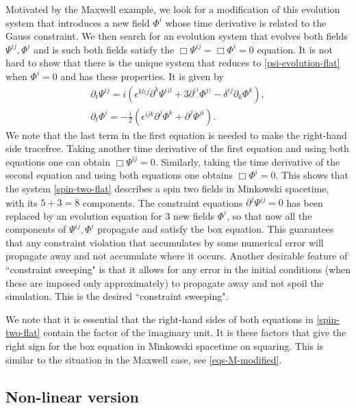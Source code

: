 \documentclass[10pt]{report}
\theoremstyle{definition}
\newcommand{\im}{i}
\begin{document}
Motivated by the Maxwell example, we look for a modification of this evolution system that introduces a new field $\Phi^i$ whose time derivative is related to the Gauss constraint. We then search for an evolution system that evolves both fields $\Psi^{ij}, \Phi^i$ and is such both fields satisfy the $\Box\Psi^{ij}=\Box \Phi^i=0$ equation. It is not hard to show that there is the unique system that reduces to \cref{psi-evolution-flat} when $\Phi^i=0$ and has these properties. It is given by
\begin{align}\label{spin-two-flat}
\partial_t \Psi^{ij} = \im \left(\epsilon^{kl(j} \partial^k \Psi^{i)l} + 3 \partial^{(i} \Phi^{j)} - \delta^{ij} \partial_k \Phi^k\right), \\ \nonumber
\partial_t \Phi^i = - \frac{\im}{2} \left( \epsilon^{ijk} \partial^j \Phi^k + \partial^{j} \Psi^{ji}\right).
\end{align}
We note that the last term in the first equation is needed to make the right-hand side tracefree. Taking another time derivative of the first equation and using both equations one can obtain $\Box\Psi^{ij}=0$. Similarly, taking the time derivative of the second equation and using both equations one obtains $\Box\Phi^i=0$. This shows that the system \cref{spin-two-flat} describes a spin two fields in Minkowski spacetime, with its $5+3=8$ components. The constraint equations $\partial^j\Psi^{ij}=0$ has been replaced by an evolution equation for 3 new fields $\Phi^i$, so that now all the components of $\Psi^{ij}, \Phi^i$ propagate and satisfy the box equation. This guarantees that any constraint violation that accumulates by some numerical error will propagate away and not accumulate where it occurs. Another desirable feature of ``constraint sweeping" is that it allows for any error in the initial conditions (when these are imposed only approximately) to propagate away and not spoil the simulation. This is the desired ``constraint sweeping". 

We note that it is essential that the right-hand sides of both equations in \cref{spin-two-flat} contain the factor of the imaginary unit. It is these factors that give the right sign for the box equation in Minkowski spacetime on squaring. This is similar to the situation in the Maxwell case, see \cref{eqs-M-modified}. 

\subsection{Non-linear version}
\end{document}
